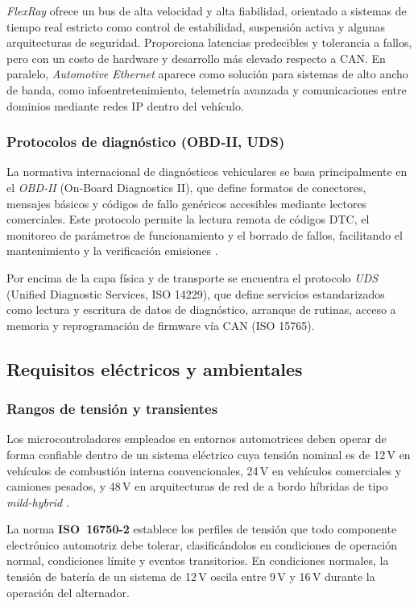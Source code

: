 \textit{FlexRay} ofrece un bus de alta velocidad y alta fiabilidad, orientado a sistemas de tiempo real estricto como control de estabilidad, suspensión activa y algunas arquitecturas de seguridad. Proporciona latencias predecibles y tolerancia a fallos, pero con un costo de hardware y desarrollo más elevado respecto a CAN. En paralelo, \textit{Automotive Ethernet} aparece como solución para sistemas de alto ancho de banda, como infoentretenimiento, telemetría avanzada y comunicaciones entre dominios mediante redes IP dentro del vehículo.

\subsubsection{Protocolos de diagnóstico (OBD‑II, UDS)}
La normativa internacional de diagnósticos vehiculares se basa principalmente en el \textit{OBD‑II} (On‑Board Diagnostics II), que define formatos de conectores, mensajes básicos y códigos de fallo genéricos accesibles mediante lectores comerciales. Este protocolo permite la lectura remota de códigos DTC, el monitoreo de parámetros de funcionamiento y el borrado de fallos, facilitando el mantenimiento y la verificación emisiones \citep{ AutomotiveEmbeddedHandbook}.

Por encima de la capa física y de transporte se encuentra el protocolo \textit{UDS} (Unified Diagnostic Services, ISO 14229), que define servicios estandarizados como lectura y escritura de datos de diagnóstico, arranque de rutinas, acceso a memoria y reprogramación de firmware vía CAN (ISO 15765). 

\subsection{Requisitos eléctricos y ambientales}
\subsubsection{Rangos de tensión y transientes}

Los microcontroladores empleados en entornos automotrices deben operar de forma confiable dentro de un sistema eléctrico cuya tensión nominal es de 12\,V en vehículos de combustión interna convencionales, 24\,V en vehículos comerciales y camiones pesados, y 48\,V en arquitecturas de red de a bordo híbridas de tipo \textit{mild-hybrid} \citep{Zimmermann2014}.

La norma \textbf{ISO~16750-2} \citep{ISO16750} establece los perfiles de tensión que todo componente electrónico automotriz debe tolerar, clasificándolos en condiciones de operación normal, condiciones límite y eventos transitorios. En condiciones normales, la tensión de batería de un sistema de 12\,V oscila entre 9\,V y 16\,V durante la operación del alternador.

